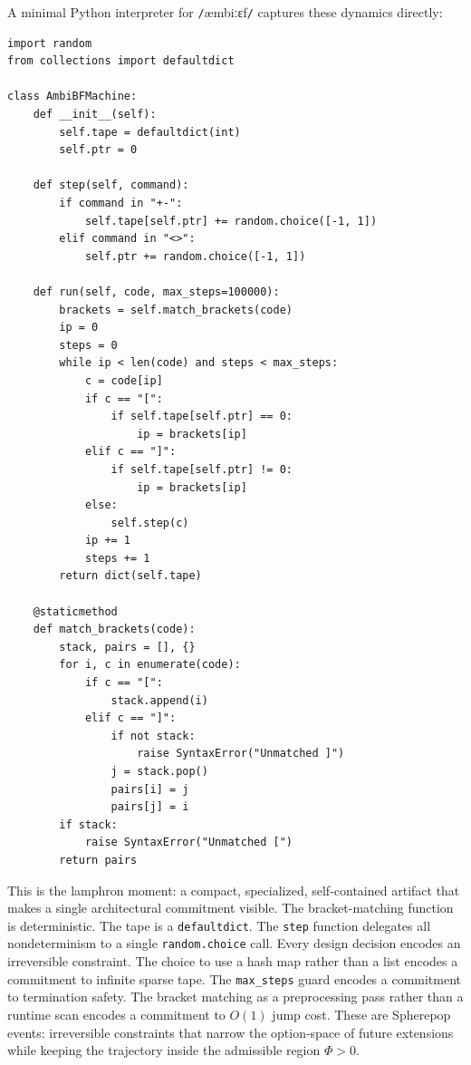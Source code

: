 \documentclass[11pt]{article}
\newcommand{\ambibf}{%
  \texttt{/}\textnormal{æmbiːɛf}\texttt{/}%
}
\begin{document}
A minimal Python interpreter for \ambibf{} captures these dynamics directly:

\begin{lstlisting}
import random
from collections import defaultdict

class AmbiBFMachine:
    def __init__(self):
        self.tape = defaultdict(int)
        self.ptr = 0

    def step(self, command):
        if command in "+-":
            self.tape[self.ptr] += random.choice([-1, 1])
        elif command in "<>":
            self.ptr += random.choice([-1, 1])

    def run(self, code, max_steps=100000):
        brackets = self.match_brackets(code)
        ip = 0
        steps = 0
        while ip < len(code) and steps < max_steps:
            c = code[ip]
            if c == "[":
                if self.tape[self.ptr] == 0:
                    ip = brackets[ip]
            elif c == "]":
                if self.tape[self.ptr] != 0:
                    ip = brackets[ip]
            else:
                self.step(c)
            ip += 1
            steps += 1
        return dict(self.tape)

    @staticmethod
    def match_brackets(code):
        stack, pairs = [], {}
        for i, c in enumerate(code):
            if c == "[":
                stack.append(i)
            elif c == "]":
                if not stack:
                    raise SyntaxError("Unmatched ]")
                j = stack.pop()
                pairs[i] = j
                pairs[j] = i
        if stack:
            raise SyntaxError("Unmatched [")
        return pairs
\end{lstlisting}

This is the lamphron moment: a compact, specialized, self-contained artifact
that makes a single architectural commitment visible. The bracket-matching
function is deterministic. The tape is a \texttt{defaultdict}. The \texttt{step}
function delegates all nondeterminism to a single \texttt{random.choice} call.
Every design decision encodes an irreversible constraint. The choice to use a
hash map rather than a list encodes a commitment to infinite sparse tape. The
\texttt{max\_steps} guard encodes a commitment to termination safety. The bracket
matching as a preprocessing pass rather than a runtime scan encodes a commitment
to $O(1)$ jump cost. These are Spherepop events: irreversible constraints that
narrow the option-space of future extensions while keeping the trajectory inside
the admissible region $\Phi > 0$.
\end{document}
